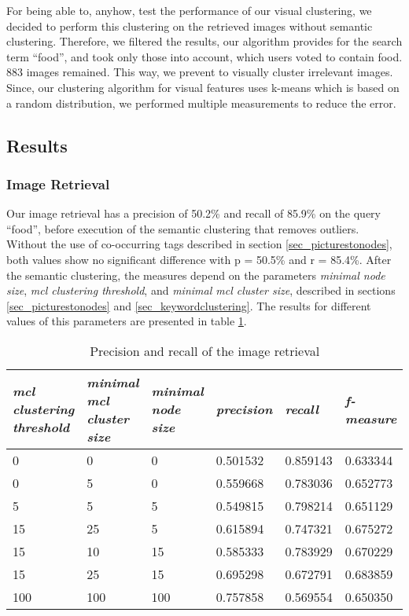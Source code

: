 For being able to, anyhow, test the performance of our visual clustering, we decided to perform this clustering on the retrieved images without semantic clustering.
Therefore, we filtered the results, our algorithm provides for the search term ``food'', and took only those into account, which users voted to contain food. 883 images remained.
This way, we prevent to visually cluster irrelevant images.
Since, our clustering algorithm for visual features uses k-means which is based on a random distribution, we performed multiple measurements to reduce the error.

\subsection{Results}
\label{sec_results}

\subsubsection{Image Retrieval}

Our image retrieval has a precision of 50.2\% and recall of 85.9\% on the query ``food'', before execution of the semantic clustering that removes outliers. Without the use of co-occurring tags described in section \ref{sec_picturestonodes}, both values show no significant difference with p = 50.5\% and r = 85.4\%.
After the semantic clustering, the measures depend on the  parameters \emph{minimal node size}, \emph{mcl clustering threshold}, and \emph{minimal mcl cluster size}, described in sections \ref{sec_picturestonodes} and \ref{sec_keywordclustering}. The results for different values of this parameters are presented in table \ref{tab_retrievalevaluation}.\\

\begin{table}[h]
   \begin{tabular}{| p{2.2cm}| p{2.2cm}| p{2cm} || p{2cm} | p{2cm} | p{2cm} |}
    \hline
    \emph{mcl clustering threshold} & \emph{minimal mcl cluster size} & \emph{minimal node size} & \emph{precision} & \emph{recall} & \emph{f-measure} \\ \hline
    0 	& 0 	& 0 & 0.501532 & 0.859143 & 0.633344 \\ \hline
    0 	& 5 	& 0 & 0.559668 & 0.783036 & 0.652773 \\ \hline
    5 	& 5 	& 5 & 0.549815 & 0.798214 & 0.651129 \\ \hline
    15 	& 25 &  5 & 0.615894 & 0.747321 & 0.675272 \\ \hline
    15 	& 10 & 15 & 0.585333 & 0.783929 & 0.670229 \\ \hline
    15 	& 25 & 15 & 0.695298 & 0.672791 & 0.683859 \\ \hline
    	100 	& 100 & 100 & 0.757858 & 0.569554 & 0.650350 \\ \hline
    \end{tabular}
    \caption{Precision and recall of the image retrieval}
	\label{tab_retrievalevaluation}
\end{table}


